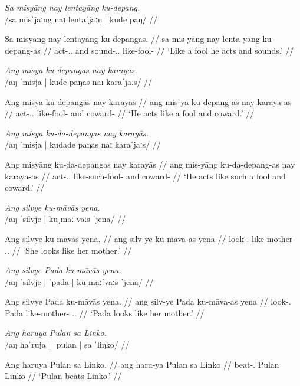 \documentclass[12pt,a4paper]{scrartcl}
\newcommand{\TsgM}{{\Tsg}.{\M}}
\newcommand{\TsgF}{{\Tsg}.{\F}}
\begin{document}
\ex\begingl
\glpreamble \textit{Sa misyāng nay lentayāng ku-depang.}\\
	/sa misˈjaːng naɪ lentaˈjaːŋ | kudeˈpaŋ/ //

\gla Sa misyāng nay lentayāng ku-depangas. //
\glb sa mis-yāng nay lenta-yāng ku-depang-as //
\glc \PatT{} act-\TsgM{}.\Aarg{} and sound-\TsgM{}.\Aarg{} like-fool-\Parg{} //
\glft `Like a fool he acts and sounds.' //
\endgl\xe

\ex\begingl
\glpreamble \textit{Ang misya ku-depangas nay karayās.}\\
	/aŋ ˈmisja | kudeˈpaŋas naɪ karaˈjaːs/ //

\gla Ang misya ku-depangas nay karayās //
\glb ang mis-ya ku-depang-as nay karaya-as //
\glc \AgtT{} act-\TsgM{}.\Aarg{} like-fool-\Parg{} and coward-\Parg{} //
\glft `He acts like a fool and coward.' //
\endgl\xe

\ex\begingl
\glpreamble \textit{Ang misya ku-da-depangas nay karayās.}\\
	/aŋ ˈmisja | kudadeˈpaŋas naɪ karaˈjaːs/ //

\gla Ang  misyāng ku-da-depangas nay karayās //
\glb ang mis-yāng ku-da-depang-as nay karaya-as //
\glc \AgtT{} act-\TsgM{}.\Aarg{} like-such-fool-\Parg{} and coward-\Parg{} //
\glft `He acts like such a fool and coward.' //
\endgl\xe

\ex\begingl
\glpreamble \textit{Ang silvye ku-māvās yena.}\\
	/aŋ ˈsilvje | kuˌmaːˈvaːs ˈjena/ //

\gla Ang silvye ku-māvās yena. //
\glb ang silv-ye ku-māva-as yena //
\glc \AgtT{} look-\TsgF{} like-mother-\Parg{} \TsgF{}.\Gen{} //
\glft `She looks like her mother.' //
\endgl\xe

\ex\begingl
\glpreamble \textit{Ang silvye Pada ku-māvās yena.}\\
	/aŋ ˈsilvje | ˈpada | kuˌmaːˈvaːs ˈjena/ //

\gla Ang silvye Pada ku-māvās yena. //
\glb ang silv-ye Pada ku-māva-as yena //
\glc \AgtT{} look-\TsgF{} Pada like-mother-\Parg{} \TsgF{}.\Gen{} //
\glft `Pada looks like her mother.' //
\endgl\xe

\pex
\a\begingl
\glpreamble \textit{Ang haruya Pulan sa Linko.} \\
	/aŋ haˈruja | ˈpulan | sa ˈliŋko/ //

\gla Ang haruya Pulan sa Linko. //
\glb ang haru-ya Pulan sa Linko //
\glc \AgtT{} beat-\TsgM{} Pulan \Parg{} Linko //
\glft `Pulan beats Linko.' //
\endgl
\end{document}
